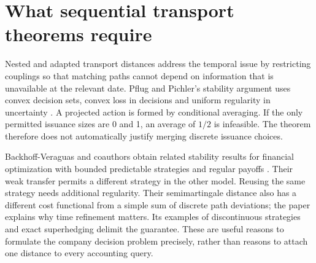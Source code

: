 
\section{What sequential transport theorems require}
Nested and adapted transport distances address the temporal issue by
restricting couplings so that matching paths cannot depend on information
that is unavailable at the relevant date. Pflug and Pichler's stability
argument uses convex decision sets, convex loss in decisions and uniform
regularity in uncertainty \cite[Definition~5.1, Theorem~6.1 and proof]{litclosepflug}.
A projected action is formed by conditional averaging. If the only permitted
issuance sizes are 0 and 1, an average of $1/2$ is infeasible. The theorem
therefore does not automatically justify merging discrete issuance choices.

Backhoff-Veraguas and coauthors obtain related stability results for financial
optimization with bounded predictable strategies and regular payoffs
\cite[Theorem~1.5; Lemma~3.7; Theorem~3.10]{litcloseadapted}. Their weak transfer
permits a different strategy in the other model. Reusing the same strategy
needs additional regularity. Their semimartingale distance also has a
different cost functional from a simple sum of discrete path deviations; the
paper explains why time refinement matters. Its examples of discontinuous
strategies and exact superhedging delimit the guarantee. These are useful
reasons to formulate the company decision problem precisely, rather than
reasons to attach one distance to every accounting query.
